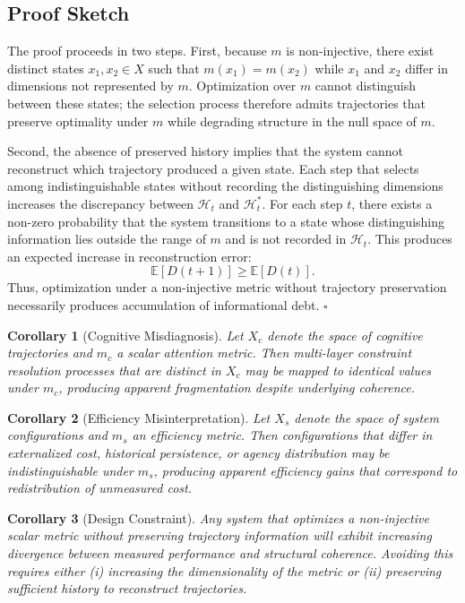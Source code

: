 \documentclass[12pt, a4paper]{article}
\newtheorem{corollary}{Corollary}[theorem]
\begin{document}
\subsection*{Proof Sketch}

The proof proceeds in two steps. First, because $m$ is non-injective, there exist distinct states $x_1, x_2 \in X$ such that $m(x_1) = m(x_2)$ while $x_1$ and $x_2$ differ in dimensions not represented by $m$. Optimization over $m$ cannot distinguish between these states; the selection process therefore admits trajectories that preserve optimality under $m$ while degrading structure in the null space of $m$.

Second, the absence of preserved history implies that the system cannot reconstruct which trajectory produced a given state. Each step that selects among indistinguishable states without recording the distinguishing dimensions increases the discrepancy between $\mathcal{H}_t$ and $\mathcal{H}_t^*$. For each step $t$, there exists a non-zero probability that the system transitions to a state whose distinguishing information lies outside the range of $m$ and is not recorded in $\mathcal{H}_t$. This produces an expected increase in reconstruction error:
\[
\mathbb{E}[D(t+1)] \geq \mathbb{E}[D(t)].
\]
Thus, optimization under a non-injective metric without trajectory preservation necessarily produces accumulation of informational debt. \hfill $\square$

\begin{corollary}[Cognitive Misdiagnosis]
Let $X_c$ denote the space of cognitive trajectories and $m_c$ a scalar attention metric. Then multi-layer constraint resolution processes that are distinct in $X_c$ may be mapped to identical values under $m_c$, producing apparent fragmentation despite underlying coherence.
\end{corollary}

\begin{corollary}[Efficiency Misinterpretation]
Let $X_s$ denote the space of system configurations and $m_s$ an efficiency metric. Then configurations that differ in externalized cost, historical persistence, or agency distribution may be indistinguishable under $m_s$, producing apparent efficiency gains that correspond to redistribution of unmeasured cost.
\end{corollary}

\begin{corollary}[Design Constraint]
Any system that optimizes a non-injective scalar metric without preserving trajectory information will exhibit increasing divergence between measured performance and structural coherence. Avoiding this requires either \textup{(i)} increasing the dimensionality of the metric or \textup{(ii)} preserving sufficient history to reconstruct trajectories.
\end{corollary}
\end{document}
